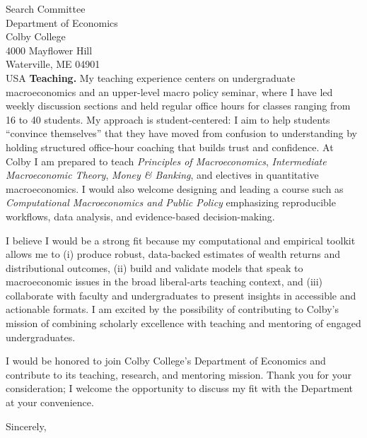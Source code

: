 \documentclass[11pt,letterpaper]{letter}
\begin{document}
\begin{letter}{Search Committee \\
Department of Economics \\
Colby College \\
4000 Mayflower Hill \\ 
Waterville, ME 04901 \\ USA}
\textbf{Teaching.} My teaching experience centers on undergraduate macroeconomics and an upper-level macro policy seminar, where I have led weekly discussion sections and held regular office hours for classes ranging from 16 to 40 students. My approach is student-centered: I aim to help students “convince themselves” that they have moved from confusion to understanding by holding structured office-hour coaching that builds trust and confidence. At Colby I am prepared to teach \textit{Principles of Macroeconomics}, \textit{Intermediate Macroeconomic Theory}, \textit{Money \& Banking}, and electives in quantitative macroeconomics. I would also welcome designing and leading a course such as \textit{Computational Macroeconomics and Public Policy} emphasizing reproducible workflows, data analysis, and evidence-based decision-making.

I believe I would be a strong fit because my computational and empirical toolkit allows me to (i) produce robust, data-backed estimates of wealth returns and distributional outcomes, (ii) build and validate models that speak to macroeconomic issues in the broad liberal‐arts teaching context, and (iii) collaborate with faculty and undergraduates to present insights in accessible and actionable formats. I am excited by the possibility of contributing to Colby’s mission of combining scholarly excellence with teaching and mentoring of engaged undergraduates.

I would be honored to join Colby College’s Department of Economics and contribute to its teaching, research, and mentoring mission. Thank you for your consideration; I welcome the opportunity to discuss my fit with the Department at your convenience.

\closing{Sincerely,}

\end{letter}
\end{document}
